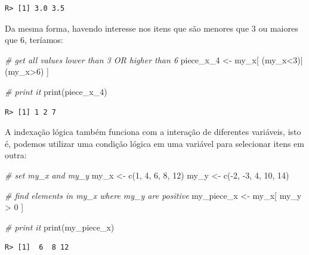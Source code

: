 \documentclass[
  11pt,
]{book}
\newenvironment{Shaded}{\begin{snugshade}}{\end{snugshade}}
\newcommand{\CommentTok}[1]{\textcolor[rgb]{0.37,0.37,0.37}{\textit{#1}}}
\newcommand{\DecValTok}[1]{\textcolor[rgb]{0.06,0.06,0.06}{#1}}
\newcommand{\FunctionTok}[1]{\textcolor[rgb]{0,0,0}{#1}}
\newcommand{\NormalTok}[1]{#1}
\newcommand{\OtherTok}[1]{\textcolor[rgb]{0.37,0.37,0.37}{#1}}
\newcommand{\SpecialCharTok}[1]{\textcolor[rgb]{0,0,0}{#1}}
\begin{document}
\begin{verbatim}
R> [1] 3.0 3.5
\end{verbatim}

Da mesma forma, havendo interesse nos itens que são menores que 3 ou maiores que 6, teríamos:

\begin{Shaded}
\begin{Highlighting}[]
\CommentTok{\# get all values lower than 3 OR higher than 6}
\NormalTok{piece\_x\_4 }\OtherTok{\textless{}{-}}\NormalTok{ my\_x[ (my\_x}\SpecialCharTok{\textless{}}\DecValTok{3}\NormalTok{)}\SpecialCharTok{|}\NormalTok{(my\_x}\SpecialCharTok{\textgreater{}}\DecValTok{6}\NormalTok{) ]}

\CommentTok{\# print it}
\FunctionTok{print}\NormalTok{(piece\_x\_4)}
\end{Highlighting}
\end{Shaded}

\begin{verbatim}
R> [1] 1 2 7
\end{verbatim}

A indexação lógica também funciona com a interação de diferentes variáveis, isto é, podemos utilizar uma condição lógica em uma variável para selecionar itens em outra:

\begin{Shaded}
\begin{Highlighting}[]
\CommentTok{\# set my\_x and my\_y}
\NormalTok{my\_x }\OtherTok{\textless{}{-}} \FunctionTok{c}\NormalTok{(}\DecValTok{1}\NormalTok{, }\DecValTok{4}\NormalTok{, }\DecValTok{6}\NormalTok{, }\DecValTok{8}\NormalTok{, }\DecValTok{12}\NormalTok{)}
\NormalTok{my\_y }\OtherTok{\textless{}{-}} \FunctionTok{c}\NormalTok{(}\SpecialCharTok{{-}}\DecValTok{2}\NormalTok{, }\SpecialCharTok{{-}}\DecValTok{3}\NormalTok{, }\DecValTok{4}\NormalTok{, }\DecValTok{10}\NormalTok{, }\DecValTok{14}\NormalTok{)}

\CommentTok{\# find elements in my\_x where my\_y are positive}
\NormalTok{my\_piece\_x }\OtherTok{\textless{}{-}}\NormalTok{ my\_x[ my\_y }\SpecialCharTok{\textgreater{}} \DecValTok{0}\NormalTok{ ]}

\CommentTok{\# print it}
\FunctionTok{print}\NormalTok{(my\_piece\_x)}
\end{Highlighting}
\end{Shaded}

\begin{verbatim}
R> [1]  6  8 12
\end{verbatim}
\end{document}
